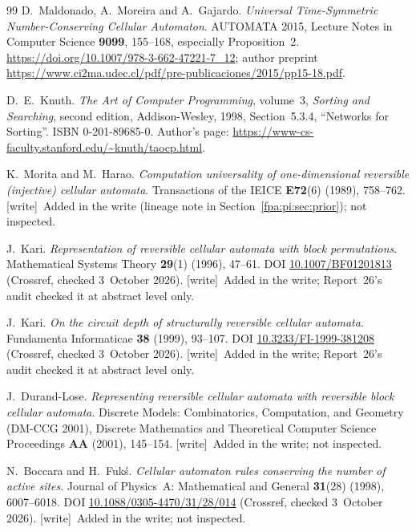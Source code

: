 \documentclass[11pt,a4paper]{article}
\numberwithin{equation}{section}
\newcommand{\wtag}{\textup{[write]}}
\begin{document}
\begin{thebibliography}{99}
D.~Maldonado, A.~Moreira and A.~Gajardo. \emph{Universal Time-Symmetric Number-Conserving Cellular Automaton}. AUTOMATA 2015, Lecture Notes in Computer Science \textbf{9099}, 155--168, especially Proposition~2. \url{https://doi.org/10.1007/978-3-662-47221-7_12}; author preprint \url{https://www.ci2ma.udec.cl/pdf/pre-publicaciones/2015/pp15-18.pdf}.

D.~E.~Knuth. \emph{The Art of Computer Programming}, volume~3, \emph{Sorting and Searching}, second edition, Addison-Wesley, 1998, Section~5.3.4, ``Networks for Sorting''. ISBN 0-201-89685-0. Author's page: \url{https://www-cs-faculty.stanford.edu/~knuth/taocp.html}.

K.~Morita and M.~Harao. \emph{Computation universality of one-dimensional reversible (injective) cellular automata}. Transactions of the IEICE \textbf{E72}(6) (1989), 758--762. \wtag\ Added in the write (lineage note in Section~\ref{fpa:pi:sec:prior}); not inspected.

J.~Kari. \emph{Representation of reversible cellular automata with block permutations}. Mathematical Systems Theory \textbf{29}(1) (1996), 47--61. DOI \href{https://doi.org/10.1007/BF01201813}{10.1007/BF01201813} (Crossref, checked 3~October 2026). \wtag\ Added in the write; Report~26's audit checked it at abstract level only.

J.~Kari. \emph{On the circuit depth of structurally reversible cellular automata}. Fundamenta Informaticae \textbf{38} (1999), 93--107. DOI \href{https://doi.org/10.3233/FI-1999-381208}{10.3233/FI-1999-381208} (Crossref, checked 3~October 2026). \wtag\ Added in the write; Report~26's audit checked it at abstract level only.

J.~Durand-Lose. \emph{Representing reversible cellular automata with reversible block cellular automata}. Discrete Models: Combinatorics, Computation, and Geometry (DM-CCG 2001), Discrete Mathematics and Theoretical Computer Science Proceedings \textbf{AA} (2001), 145--154. \wtag\ Added in the write; not inspected.

N.~Boccara and H.~Fuk\'s. \emph{Cellular automaton rules conserving the number of active sites}. Journal of Physics~A: Mathematical and General \textbf{31}(28) (1998), 6007--6018. DOI \href{https://doi.org/10.1088/0305-4470/31/28/014}{10.1088/0305-4470/31/28/014} (Crossref, checked 3~October 2026). \wtag\ Added in the write; not inspected.


\end{thebibliography}
\end{document}
